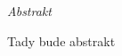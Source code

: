 \vfill
\begin{center}
{\it \large Abstrakt}
\vspace{0.2cm}

\begin{minipage}{0.8\textwidth}{
Tady bude abstrakt
}
\end{minipage}
\end{center}
\vfill
\vspace{1cm}
\newpage{}